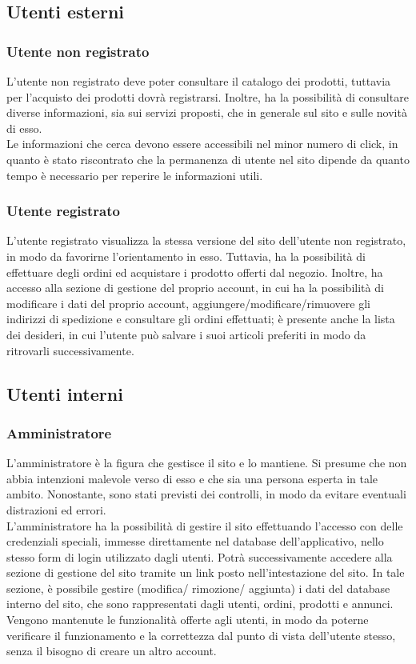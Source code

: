 	\subsection{Utenti esterni}
		\subsubsection{Utente non registrato}
		L'utente non registrato deve poter consultare il catalogo dei prodotti, tuttavia per l'acquisto dei prodotti dovrà registrarsi. Inoltre, ha la possibilità di consultare diverse informazioni, sia sui servizi proposti, che in generale sul sito e sulle novità di esso.  \\
		Le informazioni che cerca devono essere accessibili nel minor numero di click, in quanto è stato riscontrato che la permanenza di utente nel sito dipende da quanto tempo è necessario per reperire le informazioni utili.
		
		\subsubsection{Utente registrato}
		L'utente registrato visualizza la stessa versione del sito dell'utente non registrato, in modo da favorirne l'orientamento in esso. Tuttavia, ha la possibilità di effettuare degli ordini ed acquistare i prodotto offerti dal negozio. Inoltre, ha accesso alla sezione di gestione del proprio account, in cui ha la possibilità di modificare i dati del proprio account, aggiungere/modificare/rimuovere gli indirizzi di spedizione e consultare gli ordini effettuati; è presente anche la lista dei desideri, in cui l'utente può salvare i suoi articoli preferiti in modo da ritrovarli successivamente.

	\subsection{Utenti interni}
		\subsubsection{Amministratore}
		L'amministratore è la figura che gestisce il sito e lo mantiene. Si presume che non abbia intenzioni malevole verso di esso e che sia una persona esperta in tale ambito. Nonostante, sono stati previsti dei controlli, in modo da evitare eventuali distrazioni ed errori. \\
		L'amministratore ha la possibilità di gestire il sito effettuando l'accesso con delle credenziali speciali, immesse direttamente nel database dell'applicativo, nello stesso form di login utilizzato dagli utenti. Potrà successivamente accedere alla sezione di gestione del sito tramite un link posto nell'intestazione del sito. In tale sezione, è possibile gestire (modifica/ rimozione/ aggiunta) i dati del database interno del sito, che sono rappresentati dagli utenti, ordini, prodotti e annunci. \\
		Vengono mantenute le funzionalità offerte agli utenti, in modo da poterne verificare il funzionamento e la correttezza dal punto di vista dell'utente stesso, senza il bisogno di creare un altro account.

